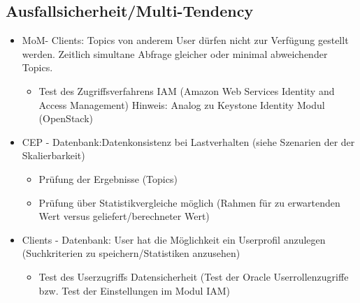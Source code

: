 \documentclass[paper,oneside,onecolumn,notitlepage,bibtotocnumbered,fontsize=12pt,bigheadings,ngerman]{scrartcl}
\begin{document}
\subsection{Ausfallsicherheit/Multi-Tendency}

\begin{itemize}

\item MoM- Clients:	Topics von anderem User dürfen nicht zur Verfügung gestellt werden. Zeitlich simultane Abfrage gleicher oder minimal abweichender Topics.		
\begin{itemize}
\item Test des Zugriffsverfahrens IAM (Amazon Web Services Identity and Access Management) Hinweis: Analog zu Keystone Identity Modul (OpenStack)
\end{itemize}


\item CEP - Datenbank:Datenkonsistenz bei Lastverhalten
(siehe Szenarien der der Skalierbarkeit)
\begin{itemize}
\item Prüfung der Ergebnisse (Topics)
\item Prüfung über Statistikvergleiche möglich (Rahmen für zu erwartenden Wert versus geliefert/berechneter Wert) 
\end{itemize}



\item Clients - Datenbank:	User hat die Möglichkeit ein Userprofil anzulegen (Suchkriterien zu speichern/Statistiken anzusehen)
\begin{itemize}
\item Test des Userzugriffs Datensicherheit (Test der Oracle Userrollenzugriffe bzw. Test der Einstellungen im Modul IAM)
\end{itemize}
\end{itemize}
\end{document}
